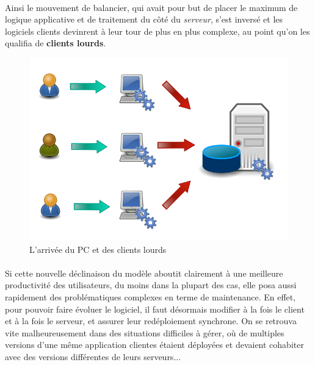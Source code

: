 {  \paragraph{} Ainsi le mouvement de balancier, qui avait pour but de placer le maximum de logique
  applicative et de traitement du côté du \textit{serveur}, s'est inversé et les logiciels clients
  devinrent à leur tour de plus en plus complexe, au point qu'on les qualifia de \textbf{clients
  lourds}.

  \begin{figure}[h]
    \begin{center}
      \includegraphics[scale=0.3]{img/fat-clients.png}
      \caption{L'arrivée du PC et des clients lourds}
      \label{fat-clients}
    \end{center}
  \end{figure}


  \paragraph{} Si cette nouvelle déclinaison du modèle aboutit clairement à une meilleure productivité
  des utilisateurs, du moins dans la plupart des cas, elle posa aussi rapidement des problématiques
  complexes en terme de maintenance. En effet, pour pouvoir faire évoluer le logiciel, il faut
  désormais modifier à la fois le client et à la fois le serveur, et assurer leur redéploiement
  synchrone. On se retrouva vite malheureusement dans des situations difficiles à gérer, où de
  multiples versions d'une même application clientes étaient déployées et devaient cohabiter avec des
  versions différentes de leurs serveurs...
}

